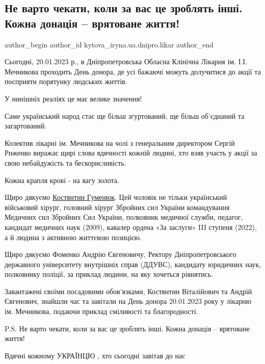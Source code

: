 
 
 
 
 

\subsection{Не варто чекати, коли за вас це зроблять інші. Кожна донація – врятоване життя!}
\label{sec:20_01_2023.fb.kytova_iryna.ua.dnipro.likar.1.ne_varto_chekati__ko}

\ifcmt
 author_begin
   author_id kytova_iryna.ua.dnipro.likar
 author_end
\fi

Сьогодні, 20.01.2023 р., в Дніпропетровська Обласна Клінічна Лікарня ім. І.І.
Мечникова проходить День донора, де усі бажаючі можуть долучитися до акції та
посприяти порятунку людських життів. 

У нинішніх реаліях це має велике значення! 

Саме український народ стає ще більш згуртований, ще більш об'єднаний та
загартований. 

Колектив лікарні ім. Мечникова на чолі з генеральним директором Сергій Риженко
виражає щирі слова вдячності кожній людині, хто взяв участь у акції за свою
небайдужість та бескорисливість. 

Кожна крапля крові -  на вагу золота. 

Щиро дякуємо \href{https://www.facebook.com/profile.php?id=100035295216049}{Костянтин Гуменюк}. Цей чоловік не тільки український військовий
хірург, головний хірург Збройних сил України командування Медичних сил Збройних
Сил України, полковник медичної служби, педагог, кандидат медичних наук (2009),
кавалер ордена «За заслуги» III ступеня (2022), а й людина з активною життєвою
позицією. 

Щиро дякуємо Фоменко Андрію Євгеновичу, Ректору Дніпропетровського державного
університету внутрішніх справ (ДДУВС), кандидату юридичних наук, полковнику
поліції, за приклад людини, на яку хочеться рівнятись.

Завантажені своїми посадовими обов'язками, Костянтин Віталійович та Андрій
Євгенович, знайшли час та завітали на День донора 20.01.2023 року у лікарню ім.
Мечникова, подаючи приклад сміливості та благородності.

P.S. Не варто чекати, коли за вас це зроблять інші. Кожна донація – врятоване
життя!

Вдячні кожному УКРАЇНЦЮ , хто сьогодні завітав до нас 🙏
